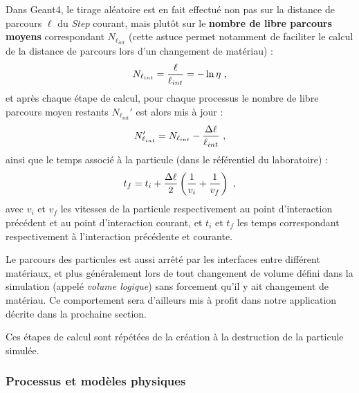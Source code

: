\begin{refsection}
Dans Geant4, le tirage aléatoire est en fait effectué non pas sur la distance de parcours $\ell$ du \textit{Step} courant, mais plutôt sur le \textbf{nombre de libre parcours moyens} correspondant $N_{\ell_{int}}$ (cette astuce permet notamment de faciliter le calcul de la distance de parcours lors d'un changement de matériau) \parencite{geant4_physref, agostinelli_2003} :
\begin{equation}
    N_{\ell_{int}}=\dfrac{\ell}{\ell_{int}} = - \ln\eta ~ \rm ,
\end{equation}
et après chaque étape de calcul, pour chaque processus le nombre de libre parcours moyen restants $N_{\ell_{int}}'$ est alors mis à jour \parencite{geant4_physref} :
\begin{equation}
    N_{\ell_{int}}'=N_{\ell_{int}} - \dfrac{\Delta \ell}{\ell_{int}} ~ \rm ,
\end{equation}
ainsi que le temps associé à la particule (dans le référentiel du laboratoire) \parencite{geant4_physref} :
\begin{equation}
    t_f = t_i +  \dfrac{\Delta \ell}{2}\left(\dfrac{1}{v_i}+\dfrac{1}{v_f}\right) ~ \rm ,
\end{equation}
avec $v_i$ et $v_f$ les vitesses de la particule respectivement au point d'interaction précédent et au point d'interaction courant, et $t_i$ et $t_f$ les temps correspondant respectivement à l'interaction précédente et courante.

Le parcours des particules est aussi arrêté par les interfaces entre différent matériaux, et plus généralement lors de tout changement de volume défini dans la simulation (appelé \textit{volume logique}) sans forcement qu'il y ait changement de matériau. Ce comportement sera d'ailleurs mis à profit dans notre application décrite dans la prochaine section.

Ces étapes de calcul sont répétées de la création à la destruction de la particule simulée. 

\subsubsection{Processus et modèles physiques}


\end{refsection}
